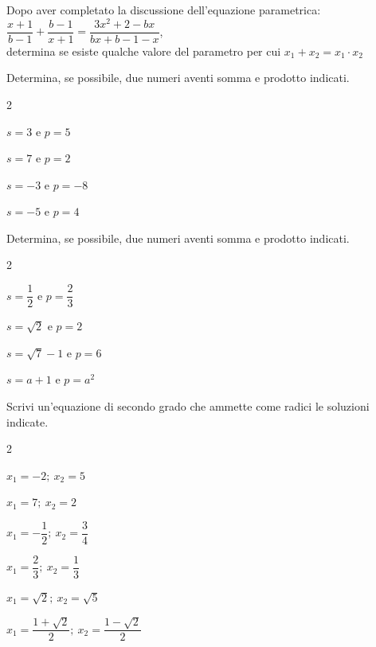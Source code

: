 \begin{esercizio}[*]
\label{ese:3.76}
Dopo aver completato la discussione dell'equazione parametrica: \\
\(\dfrac{x + 1}{b-1} + \dfrac{b-1}{x + 1}=
\dfrac{3 x^{2} + 2-b x}{b x + b-1-x}\), \\
determina se esiste qualche valore del parametro per cui
\(x_{1} + x_{2} = x_{1} \cdot x_{2}\)
\end{esercizio}

\begin{esercizio}
\label{ese:3.77}
Determina, se possibile, due numeri aventi somma e prodotto indicati.
\begin{htmulticols}{2}
\begin{enumeratea}
\item \(s = 3 \text{ e } p = 5\)
\item \(s = 7 \text{ e } p = 2\)
\item \(s =-3 \text{ e } p =-8\)
\item \(s =-5 \text{ e } p = 4\)
\end{enumeratea}
\end{htmulticols}
\end{esercizio}

\begin{esercizio}
\label{ese:3.78}
Determina, se possibile, due numeri aventi somma e prodotto indicati.
\begin{htmulticols}{2}
\begin{enumeratea}
\item \(s = \dfrac{1}{2} \text{ e } p = \dfrac{2}{3}\)
\item \(s = \sqrt{2} \text{ e } p = 2\)
\item \(s = \sqrt{7}-1 \text{ e } p = 6\)
\item \(s = a + 1 \text{ e } p= a^{2}\)
\end{enumeratea}
\end{htmulticols}
\end{esercizio}

\begin{esercizio}
\label{ese:3.79}
Scrivi un'equazione di secondo grado che ammette come radici le soluzioni 
indicate.
\begin{htmulticols}{2}
\begin{enumeratea}
\item \(x_{1} =-2;~ x_{2} = 5\)
\item \(x_{1} = 7;~ x_{2} = 2\)
\item \(x_{1} =-\dfrac{1}{2};~ x_{2} = \dfrac{3}{4}\)
\item \(x_{1} = \dfrac{2}{3};~ x_{2} = \dfrac{1}{3}\)
\item \(x_{1} = \sqrt{2};~ x_{2} = \sqrt{5}\)
\item \(x_{1} = \dfrac{1 + \sqrt{2}}{2};~ x_{2} = \dfrac{1-\sqrt{2}}{2}\)
\end{enumeratea}
\end{htmulticols}
\end{esercizio}

